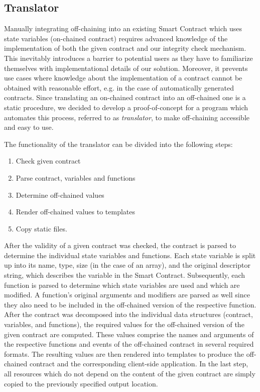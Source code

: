 \subsection{Translator}

Manually integrating off-chaining into an existing Smart Contract which uses state variables (on-chained contract) requires advanced knowledge of the implementation of both the given contract and our integrity check mechanism. This inevitably introduces a barrier to potential users as they have to familiarize themselves with implementational details of our solution. Moreover, it prevents use cases where knowledge about the implementation of a contract cannot be obtained with reasonable effort, e.g. in the case of automatically generated contracts. Since translating an on-chained contract into an off-chained one is a static procedure, we decided to develop a proof-of-concept for a program which automates this process, referred to as \emph{translator}, to make off-chaining accessible and easy to use.

The functionality of the translator can be divided into the following steps:
\begin{enumerate}
\setlength{\itemsep}{0pt}
\setlength{\parskip}{0pt}
	\item Check given contract
	\item Parse contract, variables and functions
	\item Determine off-chained values
	\item Render off-chained values to templates
	\item Copy static files.
\end{enumerate}
After the validity of a given contract was checked, the contract is parsed to determine the individual state variables and functions. Each state variable is split up into its name, type, size (in the case of an array), and the original descriptor string, which describes the variable in the Smart Contract. Subsequently, each function is parsed to determine which state variables are used and which are modified. A function's original arguments and modifiers are parsed as well since they also need to be included in the off-chained version of the respective function. After the contract was decomposed into the individual data structures (contract, variables, and functions), the required values for the off-chained version of the given contract are computed. These values comprise the names and arguments of the respective functions and events of the off-chained contract in several required formats. The resulting values are then rendered into templates to produce the off-chained contract and the corresponding client-side application. In the last step, all resources which do not depend on the content of the given contract are simply copied to the previously specified output location.

